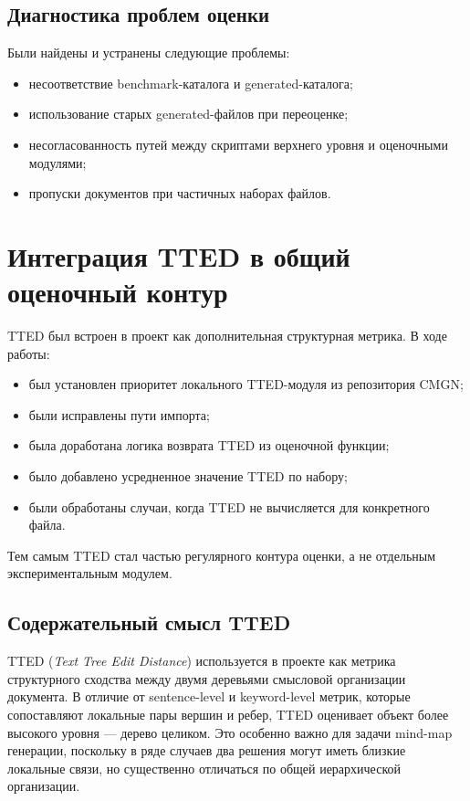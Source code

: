 \documentclass[12pt,a4paper]{article}
\begin{document}
\subsection{Диагностика проблем оценки}

Были найдены и устранены следующие проблемы:

\begin{itemize}
    \item несоответствие benchmark-каталога и generated-каталога;
    \item использование старых generated-файлов при переоценке;
    \item несогласованность путей между скриптами верхнего уровня и оценочными модулями;
    \item пропуски документов при частичных наборах файлов.
\end{itemize}

\section{Интеграция TTED в общий оценочный контур}

TTED был встроен в проект как дополнительная структурная метрика. В ходе работы:

\begin{itemize}
    \item был установлен приоритет локального TTED-модуля из репозитория CMGN;
    \item были исправлены пути импорта;
    \item была доработана логика возврата TTED из оценочной функции;
    \item было добавлено усредненное значение TTED по набору;
    \item были обработаны случаи, когда TTED не вычисляется для конкретного файла.
\end{itemize}

Тем самым TTED стал частью регулярного контура оценки, а не отдельным экспериментальным
модулем.

\subsection{Содержательный смысл TTED}

TTED (\textit{Text Tree Edit Distance}) используется в проекте как метрика структурного
сходства между двумя деревьями смысловой организации документа. В отличие от
sentence-level и keyword-level метрик, которые сопоставляют локальные пары вершин и ребер,
TTED оценивает объект более высокого уровня --- дерево целиком. Это особенно важно для
задачи mind-map генерации, поскольку в ряде случаев два решения могут иметь близкие
локальные связи, но существенно отличаться по общей иерархической организации.
\end{document}
